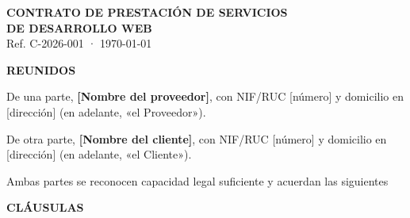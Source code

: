 \documentclass[11pt,a4paper]{article}
\begin{document}
\begin{center}
  {\Large\bfseries CONTRATO DE PRESTACIÓN DE SERVICIOS\\DE DESARROLLO WEB}\\[4pt]
  {\small Ref. C-2026-001 · \today}
\end{center}

\vspace{0.8em}
\textbf{REUNIDOS}

De una parte, \textbf{[Nombre del proveedor]}, con NIF/RUC [número] y domicilio
en [dirección] (en adelante, «el Proveedor»).

De otra parte, \textbf{[Nombre del cliente]}, con NIF/RUC [número] y domicilio
en [dirección] (en adelante, «el Cliente»).

Ambas partes se reconocen capacidad legal suficiente y acuerdan las siguientes

\begin{center}\textbf{CLÁUSULAS}\end{center}
\end{document}

